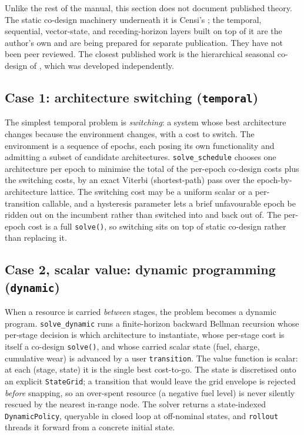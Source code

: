 \documentclass[11pt,a4paper]{article}
\begin{document}
Unlike the rest of the manual, this section does not document published
theory. The static co-design machinery underneath it is Censi's
\citep{censi2015mathematical}; the temporal, sequential, vector-state, and
receding-horizon layers built on top of it are the author's own and are
being prepared for separate publication. They have not been peer reviewed.
The closest published work is the hierarchical seasonal co-design of
\citet{neumann2025formula1}, which was developed independently.

\subsection{Case 1: architecture switching (\texttt{temporal})}

The simplest temporal problem is \emph{switching}: a system whose best
architecture changes because the environment changes, with a cost to
switch. The environment is a sequence of epochs, each posing its own
functionality and admitting a subset of candidate architectures.
\texttt{solve\_schedule} chooses one architecture per epoch to minimise
the total of the per-epoch co-design costs plus the switching costs, by an
exact Viterbi (shortest-path) pass over the epoch-by-architecture lattice.
The switching cost may be a uniform scalar or a per-transition callable,
and a hysteresis parameter lets a brief unfavourable epoch be ridden out
on the incumbent rather than switched into and back out of. The per-epoch
cost is a full \texttt{solve()}, so switching sits on top of static
co-design rather than replacing it.

\subsection{Case 2, scalar value: dynamic programming (\texttt{dynamic})}

When a resource is carried \emph{between} stages, the problem becomes a
dynamic program. \texttt{solve\_dynamic} runs a finite-horizon backward
Bellman recursion whose per-stage decision is which architecture to
instantiate, whose per-stage cost is itself a co-design \texttt{solve()},
and whose carried scalar state (fuel, charge, cumulative wear) is advanced
by a user \texttt{transition}. The value function is scalar: at each
(stage, state) it is the single best cost-to-go. The state is discretised
onto an explicit \texttt{StateGrid}; a transition that would leave the
grid envelope is rejected \emph{before} snapping, so an over-spent
resource (a negative fuel level) is never silently rescued by the nearest
in-range node. The solver returns a state-indexed \texttt{DynamicPolicy},
queryable in closed loop at off-nominal states, and \texttt{rollout}
threads it forward from a concrete initial state.
\end{document}
